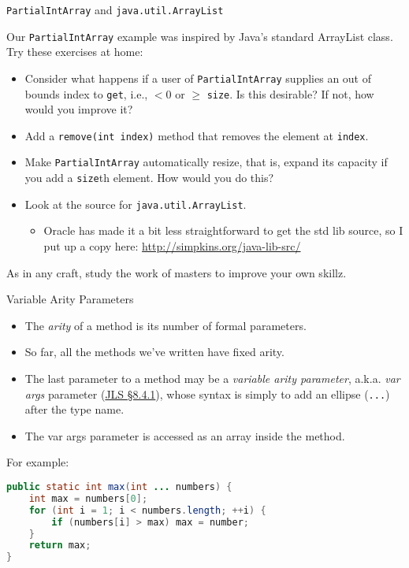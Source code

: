 \documentclass{beamer}
\begin{document}
\begin{frame}[fragile]{{\tt PartialIntArray} and {\tt java.util.ArrayList}}


Our {\tt PartialIntArray} example was inspired by Java's standard ArrayList class.  Try these exercises at home:
\begin{itemize}
\item Consider what happens if a user of {\tt PartialIntArray} supplies an out of bounds index to {\tt get}, i.e., $< 0$ or $\ge$ {\tt size}.  Is this desirable?  If not, how would you improve it?
\item Add a {\tt remove(int index)} method that removes the element at {\tt index}.
\item Make {\tt PartialIntArray} automatically resize, that is, expand its capacity if you add a {\tt size}th element.  How would you do this?
\item Look at the source for {\tt java.util.ArrayList}.
\begin{itemize}
\item Oracle has made it a bit less straightforward to get the std lib source, so I put up a copy here: \url{http://simpkins.org/java-lib-src/}
\end{itemize}
\end{itemize}

As in any craft, study the work of masters to improve your own skillz.

\end{frame}

\begin{frame}[fragile]{Variable Arity Parameters}


\begin{itemize}
\item The {\it arity} of a method is its number of formal parameters.
\item So far, all the methods we've written have fixed arity.
\item The last parameter to a method may be a {\it variable arity parameter}, a.k.a. {\it var args} parameter (\href{http://docs.oracle.com/javase/specs/jls/se7/html/jls-8.html#jls-8.4.1}{JLS \S 8.4.1}), whose syntax is simply to add an ellipse ({\tt ...}) after the type name.
\item The var args parameter is accessed as an array inside the method.
\end{itemize}
For example:
\begin{lstlisting}[language=Java]
public static int max(int ... numbers) {
    int max = numbers[0];
    for (int i = 1; i < numbers.length; ++i) {
        if (numbers[i] > max) max = number;
    }
    return max;
}
\end{lstlisting}

\end{frame}
\end{document}
